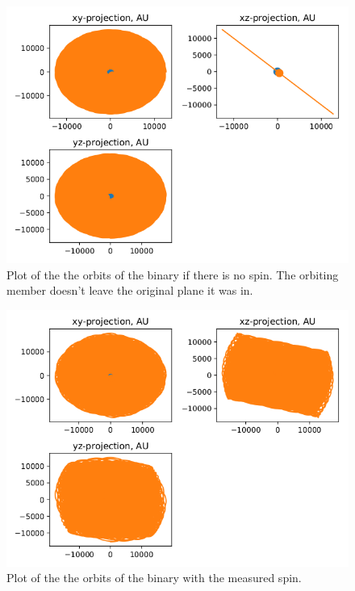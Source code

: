 \documentclass[english, oneside]{HYgradu}
\begin{document}
\begin{figure}[h!tb]
\centering
\includegraphics[width=\textwidth]{../images/spin0Orbits.png}
\caption{Plot of the the orbits of the binary if there is no spin. The orbiting member doesn't leave the original plane it was in.}
\label{fig:spin0Orbits}
\end{figure}

\begin{figure}[h!tb]
\centering
\includegraphics[width=\textwidth]{../images/spinNormalOrbits.png}
\caption{Plot of the the orbits of the binary with the measured spin.}
\label{fig:spinNormalOrbits}
\end{figure}
\end{document}
